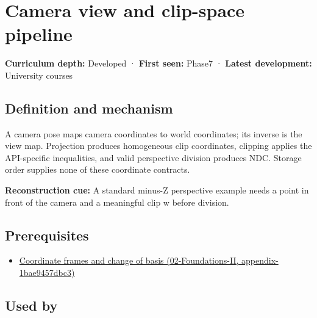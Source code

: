 \hypertarget{appendix-1c07d64f5e70}{}
\section{Camera view and clip-space pipeline}\label{appendix-1c07d64f5e70-camera-view-and-clip-space-pipeline}

\textbf{Curriculum depth:} Developed · \textbf{First seen:} Phase7 · \textbf{Latest development:} University courses

\subsection{Definition and mechanism}\label{appendix-1c07d64f5e70-definition-and-mechanism}

A camera pose maps camera coordinates to world coordinates; its inverse is the view map. Projection produces homogeneous clip coordinates, clipping applies the API-specific inequalities, and valid perspective division produces NDC. Storage order supplies none of these coordinate contracts.

\textbf{Reconstruction cue:} A standard minus-Z perspective example needs a point in front of the camera and a meaningful clip w before division.

\subsection{Prerequisites}\label{appendix-1c07d64f5e70-prerequisites}

\begin{itemize}
\tightlist
\item
  \href{../02-Foundations-II/main.pdf\#nameddest=appendix-1bae9457dbc3}{Coordinate frames and change of basis (02-Foundations-II, appendix-1bae9457dbc3)}
\end{itemize}

\subsection{Used by}\label{appendix-1c07d64f5e70-used-by}

